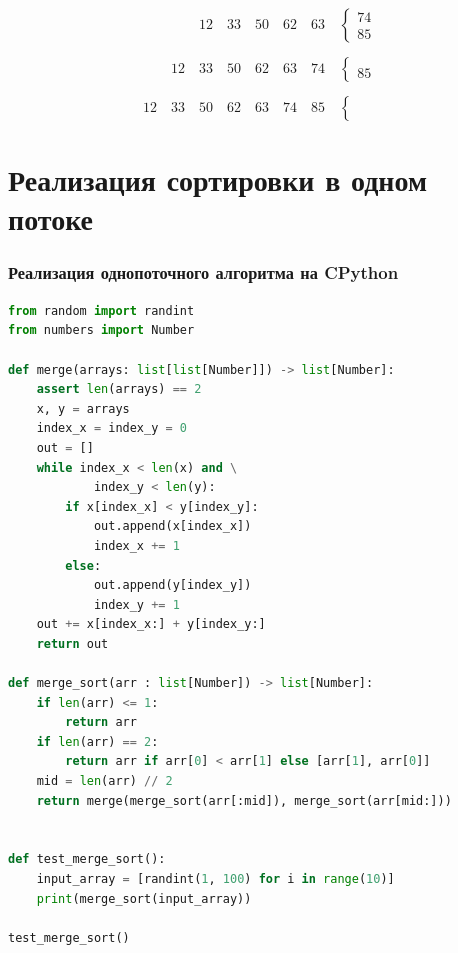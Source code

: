 \documentclass{beamer}
\begin{document}
	\begin{frame}
		\begin{equation}
			\phantom{00}\quad\phantom{00}\quad12\quad33\quad50\quad62\quad63\quad\left\{
			\begin{matrix}
				74 \\
				85
			\end{matrix}
			\right.
		\end{equation}
	
		\begin{equation}
			\phantom{00}\quad12\quad33\quad50\quad62\quad63\quad74\quad\left\{
			\begin{matrix}
				\\
				85
			\end{matrix}
			\right.
		\end{equation}
	
		\begin{equation}
			12\quad33\quad50\quad62\quad63\quad74\quad85\quad\left\{
			\begin{matrix}
				\\
				\phantom{00}
			\end{matrix}
			\right.
		\end{equation}
	\end{frame}

	

	\section{Реализация сортировки в одном потоке}
	\begin{frame}[fragile]
		\frametitle{Реализация однопоточного алгоритма на CPython}
		
		\begin{lstlisting}[language=Python, basicstyle=\tiny]
from random import randint
from numbers import Number

def merge(arrays: list[list[Number]]) -> list[Number]:
	assert len(arrays) == 2
	x, y = arrays
	index_x = index_y = 0
	out = []
	while index_x < len(x) and \
			index_y < len(y):
		if x[index_x] < y[index_y]:
			out.append(x[index_x])
			index_x += 1
		else:
			out.append(y[index_y])
			index_y += 1
	out += x[index_x:] + y[index_y:]
	return out

def merge_sort(arr : list[Number]) -> list[Number]:
	if len(arr) <= 1:
		return arr
	if len(arr) == 2:
		return arr if arr[0] < arr[1] else [arr[1], arr[0]]
	mid = len(arr) // 2
	return merge(merge_sort(arr[:mid]), merge_sort(arr[mid:]))


def test_merge_sort():
	input_array = [randint(1, 100) for i in range(10)]
	print(merge_sort(input_array))

test_merge_sort()
		\end{lstlisting}
		
	\end{frame}
\end{document}
